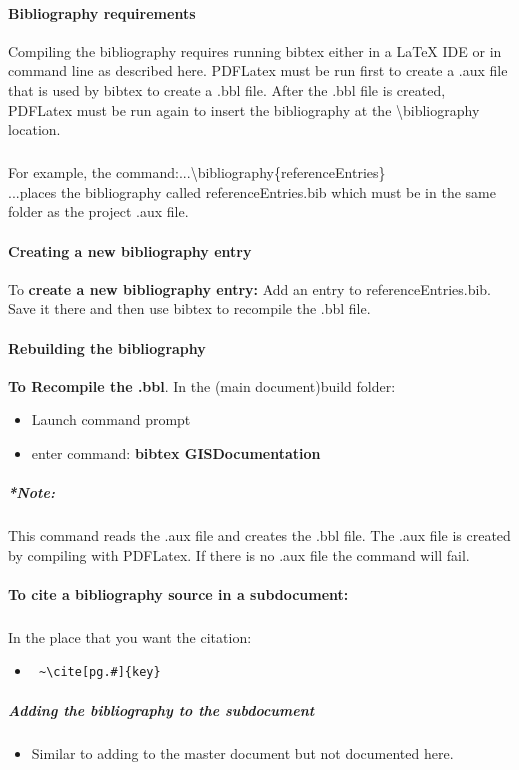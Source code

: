 \paragraph{Bibliography requirements}
Compiling the bibliography requires running bibtex either in a \LaTeX{} IDE or in command line as described here.  PDFLatex must be run first to create a .aux file that is used by bibtex to create a .bbl file.  After the .bbl file is created, PDFLatex must be run again to insert the bibliography at the \textbackslash bibliography location.
\subparagraph*{}
For example, the command:...\textbackslash bibliography\{referenceEntries\}\\
...places the bibliography called referenceEntries.bib which must be in the same folder as the project .aux file.
\paragraph{Creating a new bibliography entry}
To \textbf{create a new bibliography entry:} Add an entry to referenceEntries.bib.  Save it there and then use bibtex to recompile the .bbl file.
\paragraph{Rebuilding the bibliography}
\textbf{To Recompile the .bbl}.  In the (main document)build folder:
\begin{itemize}
\item Launch command prompt
\item enter command: \textbf{{\large bibtex GISDocumentation}}
\end{itemize}
\subparagraph*{*Note:} {\footnotesize This command reads the .aux file and creates the .bbl file.  The .aux file is created by compiling with PDFLatex.  If there is no .aux file the command will fail.}

\paragraph{To cite a bibliography source in a subdocument:}
\subparagraph{}In the place that you want the citation:
\begin{itemize}
\item \begin{verbatim} ~\cite[pg.#]{key}\end{verbatim}
\end{itemize}
\subparagraph{Adding the bibliography to the subdocument}
\begin{itemize}
\item Similar to adding to the master document but not documented here.
\end{itemize}


